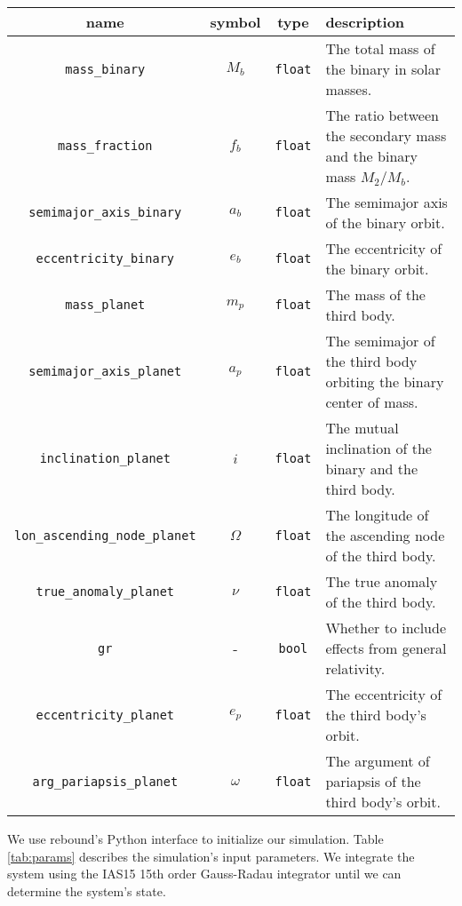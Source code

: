 \documentclass[twocolumn]{aastex631}
\begin{document}
\begin{table*}
    \begin{tabular}{cccp{}}
        \hline
        name & symbol & type & description \\
        \hline
        \texttt{mass\_binary} & $M_b$ & \texttt{float} & The total mass of the binary in solar masses. \\
        \texttt{mass\_fraction} & $f_b$ & \texttt{float} & The ratio between the secondary mass and the binary mass $M_2/M_b$. \\
        \texttt{semimajor\_axis\_binary} & $a_b$ & \texttt{float} & The semimajor axis of the binary orbit. \\
        \texttt{eccentricity\_binary} & $e_b$ & \texttt{float} & The eccentricity of the binary orbit. \\
        \texttt{mass\_planet} & $m_p$ & \texttt{float} & The mass of the third body. \\
        \texttt{semimajor\_axis\_planet} & $a_p$ & \texttt{float} & The semimajor of the third body orbiting the binary center of mass. \\
        \texttt{inclination\_planet} & $i$ & \texttt{float} & The mutual inclination of the binary and the third body. \\
        \texttt{lon\_ascending\_node\_planet} & $\Omega$ & \texttt{float} & The longitude of the ascending node of the third body. \\
        \texttt{true\_anomaly\_planet} & $\nu$ & \texttt{float} & The true anomaly of the third body. \\
        \texttt{gr} & - & \texttt{bool} & Whether to include effects from general relativity. \\
        \texttt{eccentricity\_planet} & $e_p$ & \texttt{float} & The eccentricity of the third body's orbit. \\
        \texttt{arg\_pariapsis\_planet} & $\omega$ & \texttt{float} & The argument of pariapsis of the third body's orbit. \\
        \hline
    \end{tabular}
    \caption{Simulation parameters}
    \label{tab:params}
\end{table*}

We use {\sc rebound}'s Python interface to initialize our simulation. Table \ref{tab:params} describes the simulation's
input parameters. We integrate the system using the IAS15 15th order Gauss-Radau integrator \citep{reboundias15}
until we can determine the system's state.
\end{document}
